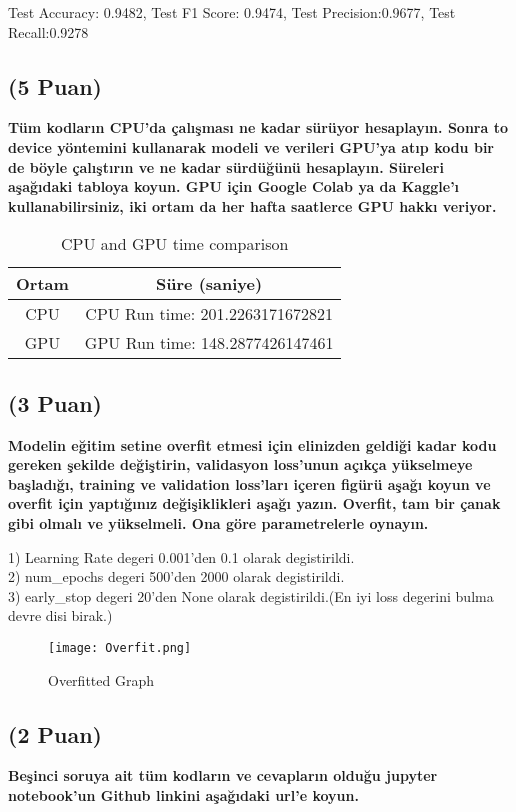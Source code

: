 \documentclass[11pt]{article}
\begin{document}
Test Accuracy: 0.9482, Test F1 Score: 0.9474, Test Precision:0.9677, Test Recall:0.9278
\newpage
\subsection{(5 Puan)} \textbf{Tüm kodların CPU'da çalışması ne kadar sürüyor hesaplayın. Sonra to device yöntemini kullanarak modeli ve verileri GPU'ya atıp kodu bir de böyle çalıştırın ve ne kadar sürdüğünü hesaplayın. Süreleri aşağıdaki tabloya koyun. GPU için Google Colab ya da Kaggle'ı kullanabilirsiniz, iki ortam da her hafta saatlerce GPU hakkı veriyor.}

\begin{table}[ht!]
    \centering
    \caption{CPU and GPU time comparison}
    \begin{tabular}{c|c}
        Ortam & Süre (saniye) \\\hline
        CPU & CPU Run time: 201.2263171672821\\
        GPU & GPU Run time: 148.2877426147461\\
    \end{tabular}
    \label{tab:my_table}
\end{table}

\subsection{(3 Puan)} \textbf{Modelin eğitim setine overfit etmesi için elinizden geldiği kadar kodu gereken şekilde değiştirin, validasyon loss'unun açıkça yükselmeye başladığı, training ve validation loss'ları içeren figürü aşağı koyun ve overfit için yaptığınız değişiklikleri aşağı yazın. Overfit, tam bir çanak gibi olmalı ve yükselmeli. Ona göre parametrelerle oynayın.}

1) Learning Rate degeri 0.001'den 0.1 olarak degistirildi.\\ 
2) num\_epochs degeri 500'den 2000 olarak degistirildi. \\
3) early\_stop degeri 20'den None olarak degistirildi.(En iyi loss degerini bulma devre disi birak.)

\begin{figure}[ht!]
    \centering
    \texttt{[image: Overfit.png]}
    \caption{Overfitted Graph}
    \label{fig:my_pic}
\end{figure}

\subsection{(2 Puan)} \textbf{Beşinci soruya ait tüm kodların ve cevapların olduğu jupyter notebook'un Github linkini aşağıdaki url'e koyun.}
\end{document}
